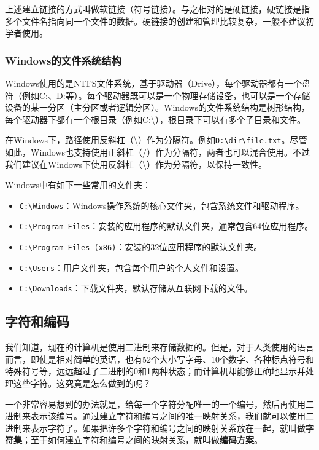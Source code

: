 上述建立链接的方式叫做软链接（符号链接）。与之相对的是硬链接，硬链接是指多个文件名指向同一个文件的数据。硬链接的创建和管理比较复杂，一般不建议初学者使用。

\subsubsection{Windows的文件系统结构}

Windows使用的是NTFS文件系统，基于驱动器（Drive），每个驱动器都有一个盘符（例如C:、D:等）。每个驱动器既可以是一个物理存储设备，也可以是一个存储设备的某一分区（主分区或者逻辑分区）。Windows的文件系统结构是树形结构，每个驱动器下都有一个根目录（例如C:\textbackslash），根目录下可以有多个子目录和文件。

在Windows下，路径使用反斜杠（\textbackslash）作为分隔符。例如\texttt{D:\textbackslash dir\textbackslash file.txt}。尽管如此，Windows也支持使用正斜杠（/）作为分隔符，两者也可以混合使用。不过我们建议在Windows下使用反斜杠（\textbackslash）作为分隔符，以保持一致性。

Windows中有如下一些常用的文件夹：
\begin{itemize}
  \item \texttt{C:\textbackslash Windows}：Windows操作系统的核心文件夹，包含系统文件和驱动程序。
  \item \texttt{C:\textbackslash Program Files}：安装的应用程序的默认文件夹，通常包含64位应用程序。
  \item \texttt{C:\textbackslash Program Files (x86)}：安装的32位应用程序的默认文件夹。
  \item \texttt{C:\textbackslash Users}：用户文件夹，包含每个用户的个人文件和设置。
  \item \texttt{C:\textbackslash Downloads}：下载文件夹，默认存储从互联网下载的文件。
\end{itemize}

\subsection{字符和编码}\label{sec:locale}

我们知道，现在的计算机是使用二进制来存储数据的。但是，对于人类使用的语言而言，即使是相对简单的英语，也有52个大小写字母、10个数字、各种标点符号和特殊符号等，远远超过了二进制的0和1两种状态；而计算机却能够正确地显示并处理这些字符。这究竟是怎么做到的呢？

一个非常容易想到的办法就是，给每一个字符分配唯一的一个编号，然后再使用二进制来表示该编号。通过建立字符和编号之间的唯一映射关系，我们就可以使用二进制来表示字符了。如果把许多个字符和编号之间的映射关系放在一起，就叫做\textbf{字符集}；至于如何建立字符和编号之间的映射关系，就叫做\textbf{编码方案}。

